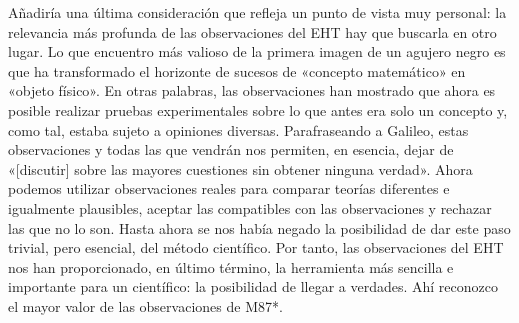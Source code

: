 Añadiría una última consideración que refleja un punto de vista muy personal: la relevancia más profunda de las observaciones del EHT hay que buscarla en otro lugar. Lo que encuentro más valioso de la primera imagen de un agujero negro es que ha transformado el horizonte de sucesos de «concepto matemático» en «objeto físico». En otras palabras, las observaciones han mostrado que ahora es posible realizar pruebas experimentales sobre lo que antes era solo un concepto y, como tal, estaba sujeto a opiniones diversas. Parafraseando a Galileo, estas observaciones y todas las que vendrán nos permiten, en esencia, dejar de «[discutir] sobre las mayores cuestiones sin obtener ninguna verdad». Ahora podemos utilizar observaciones reales para comparar teorías diferentes e igualmente plausibles, aceptar las compatibles con las observaciones y rechazar las que no lo son. Hasta ahora se nos había negado la posibilidad de dar este paso trivial, pero esencial, del método científico. Por tanto, las observaciones del EHT nos han proporcionado, en último término, la herramienta más sencilla e importante para un científico: la posibilidad de llegar a verdades. Ahí reconozco el mayor valor de las observaciones de M87*.
